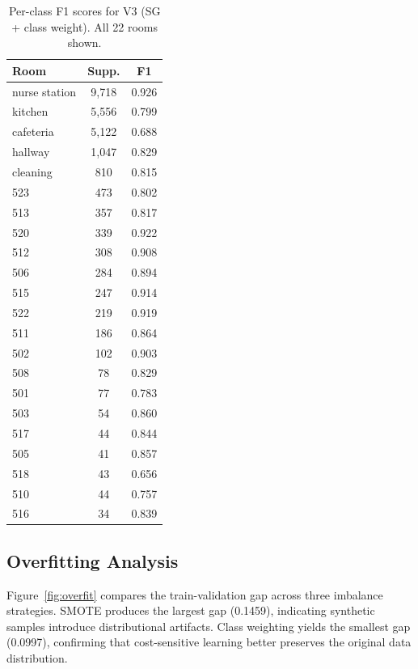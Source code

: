\documentclass{iopconfser}
\begin{document}
\begin{table}[h]
\centering
\caption{Per-class F1 scores for V3 (SG + class weight). All 22 rooms shown.}
\label{tab:per_class}
\begin{tabular}{lcc}
\toprule
\textbf{Room} & \textbf{Supp.} & \textbf{F1} \\
\midrule
nurse station & 9,718 & 0.926 \\
kitchen       & 5,556 & 0.799 \\
cafeteria     & 5,122 & 0.688 \\
hallway       & 1,047 & 0.829 \\
cleaning      & 810   & 0.815 \\
523           & 473   & 0.802 \\
513           & 357   & 0.817 \\
520           & 339   & 0.922 \\
512           & 308   & 0.908 \\
506           & 284   & 0.894 \\
515           & 247   & 0.914 \\
522           & 219   & 0.919 \\
511           & 186   & 0.864 \\
502           & 102   & 0.903 \\
508           & 78    & 0.829 \\
501           & 77    & 0.783 \\
503           & 54    & 0.860 \\
517           & 44    & 0.844 \\
505           & 41    & 0.857 \\
518           & 43    & 0.656 \\
510           & 44    & 0.757 \\
516           & 34    & 0.839 \\
\bottomrule
\end{tabular}
\end{table}

\subsection{Overfitting Analysis}

Figure~\ref{fig:overfit} compares the train-validation gap across three imbalance strategies. SMOTE produces the largest gap (0.1459), indicating synthetic samples introduce distributional artifacts. Class weighting yields the smallest gap (0.0997), confirming that cost-sensitive learning better preserves the original data distribution.
\end{document}
